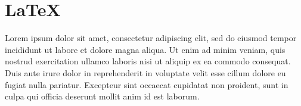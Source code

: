 \documentclass{jsarticle}
\begin{document}
  \section{\LaTeX}
  Lorem ipsum dolor sit amet, consectetur adipiscing elit, sed do eiusmod tempor incididunt ut labore et dolore magna
  aliqua. Ut enim ad minim veniam, quis nostrud exercitation ullamco laboris nisi ut aliquip ex ea commodo consequat.
  Duis aute irure dolor in reprehenderit in voluptate velit esse cillum dolore eu fugiat nulla pariatur. Excepteur sint
  occaecat cupidatat non proident, sunt in culpa qui officia deserunt mollit anim id est laborum.
\end{document}
